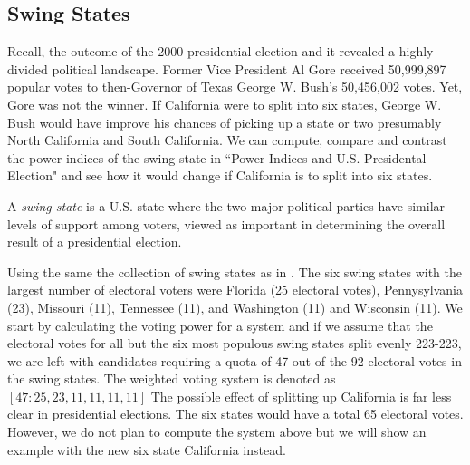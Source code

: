 \documentclass[12pt]{article}
\newenvironment{definition}[1][Definition]{\begin{trivlist}
\item[\hskip \labelsep {\bfseries #1}]}{\end{trivlist}}
\begin{document}
\subsection{Swing States}
Recall, the outcome of the 2000 presidential election and it revealed a highly divided political landscape. Former Vice President Al Gore received 50,999,897 popular votes to then-Governor of Texas George W. Bush's 50,456,002 votes. Yet, Gore was not the winner.\cite{C} If California were to split into six states,
George W. Bush would have improve his chances of picking up a state or two presumably North California and South California. We can compute, compare and contrast the power indices of the swing state in ``Power Indices and U.S. Presidental Election" and see how it would change if California is to split into six states. 
\begin{definition} 
A \textit{swing state} is a U.S. state where the two major political parties have similar levels of support among voters, viewed as important in determining the overall result of a presidential election. 
\end{definition}
Using the same the collection of swing states as in \cite{C}. The six swing states with the largest number of electoral voters were Florida (25 electoral votes), Pennysylvania (23), Missouri (11), Tennessee (11), and Washington (11) and Wisconsin (11). We start by calculating the voting power for a system and if we assume that the electoral votes for all but the six most populous swing states split evenly 223-223, we are left with candidates requiring a quota of 47 out of the 92 electoral votes in the swing states. The weighted voting system is denoted as $[47:25,23,11,11,11,11]$ The possible effect of splitting up California is far less clear in presidential elections. The six states would have a total 65 electoral votes. However, we do not plan to compute the system above but we will show an example with the new six state California instead. 

 
\end{document}
